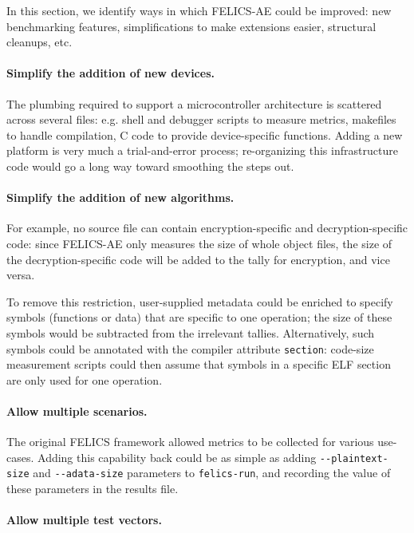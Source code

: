 \documentclass{article}
\begin{document}
In this section, we identify ways in which FELICS-AE could be
improved: new benchmarking features, simplifications to make
extensions easier, structural cleanups, etc.

\paragraph{Simplify the addition of new devices.}

The plumbing required to support a microcontroller architecture is
scattered across several files: e.g. shell and debugger scripts to
measure metrics, makefiles to handle compilation, C code to provide
device-specific functions.  Adding a new platform is very much a
trial-and-error process; re-organizing this infrastructure code would
go a long way toward smoothing the steps out.

\paragraph{Simplify the addition of new algorithms.}

For example, no source file can contain encryption-specific and
decryption-specific code: since FELICS-AE only measures the size of
whole object files, the size of the decryption-specific code will be
added to the tally for encryption, and vice versa.

To remove this restriction, user-supplied metadata could be enriched
to specify symbols (functions or data) that are specific to one
operation; the size of these symbols would be subtracted from the
irrelevant tallies.  Alternatively, such symbols could be annotated
with the compiler attribute \texttt{section}: code-size measurement
scripts could then assume that symbols in a specific ELF section are
only used for one operation.

\paragraph{Allow multiple scenarios.}

The original FELICS framework allowed metrics to be collected for
various use-cases.  Adding this capability back could be as simple as
adding \texttt{-{}-plaintext-size} and \texttt{-{}-adata-size}
parameters to \texttt{felics-run}, and recording the value of these
parameters in the results file.

\paragraph{Allow multiple test vectors.}
\end{document}
